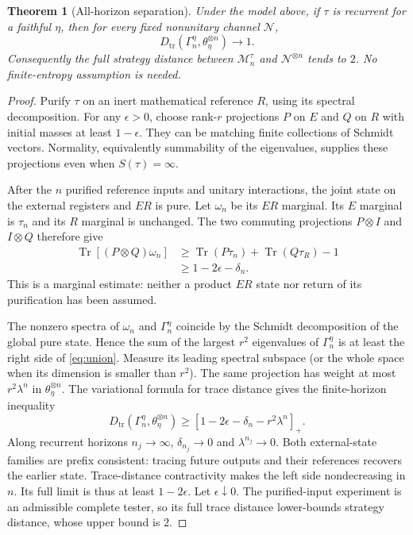 \documentclass[11pt]{article}
\newtheorem{theorem}{Theorem}[section]
\theoremstyle{definition}\newtheorem{definition}[theorem]{Definition}
\newcommand{\Tr}{\operatorname{Tr}}
\newcommand{\cN}{\mathcal N}
\newcommand{\cM}{\mathcal M}
\newcommand{\D}{D_{\mathrm{tr}}}
\begin{document}
\begin{theorem}[All-horizon separation]\label{thm:separation}
Under the model above, if $\tau$ is recurrent for a faithful $\eta$, then for every fixed nonunitary channel $\cN$,
\[
 \D(\Gamma_n^\eta,\theta_\eta^{\otimes n})\longrightarrow1.
\]
Consequently the full strategy distance between $\cM_n^\tau$ and $\cN^{\otimes n}$ tends to $2$. No finite-entropy assumption is needed.
\end{theorem}
\begin{proof}
Purify $\tau$ on an inert mathematical reference $R$, using its spectral decomposition. For any $\epsilon>0$, choose rank-$r$ projections $P$ on $E$ and $Q$ on $R$ with initial masses at least $1-\epsilon$. They can be matching finite collections of Schmidt vectors. Normality, equivalently summability of the eigenvalues, supplies these projections even when $S(\tau)=\infty$.

After the $n$ purified reference inputs and unitary interactions, the joint state on the external registers and $ER$ is pure. Let $\omega_n$ be its $ER$ marginal. Its $E$ marginal is $\tau_n$ and its $R$ marginal is unchanged. The two commuting projections $P\otimes I$ and $I\otimes Q$ therefore give
\begin{align}
 \Tr[(P\otimes Q)\omega_n]
 &\ge \Tr(P\tau_n)+\Tr(Q\tau_R)-1\\
 &\ge1-2\epsilon-\delta_n. \label{eq:union}
\end{align}
This is a marginal estimate: neither a product $ER$ state nor return of its purification has been assumed.

The nonzero spectra of $\omega_n$ and $\Gamma_n^\eta$ coincide by the Schmidt decomposition of the global pure state. Hence the sum of the largest $r^2$ eigenvalues of $\Gamma_n^\eta$ is at least the right side of \eqref{eq:union}. Measure its leading spectral subspace (or the whole space when its dimension is smaller than $r^2$). The same projection has weight at most $r^2\lambda^n$ in $\theta_\eta^{\otimes n}$. The variational formula for trace distance gives the finite-horizon inequality
\begin{equation}
 \D(\Gamma_n^\eta,\theta_\eta^{\otimes n})
 \ge[1-2\epsilon-\delta_n-r^2\lambda^n]_+.
 \label{eq:faithful-bound}
\end{equation}
Along recurrent horizons $n_j\to\infty$, $\delta_{n_j}\to0$ and $\lambda^{n_j}\to0$. Both external-state families are prefix consistent: tracing future outputs and their references recovers the earlier state. Trace-distance contractivity makes the left side nondecreasing in $n$. Its full limit is thus at least $1-2\epsilon$. Let $\epsilon\downarrow0$. The purified-input experiment is an admissible complete tester, so its full trace distance lower-bounds strategy distance, whose upper bound is $2$.
\end{proof}
\end{document}
